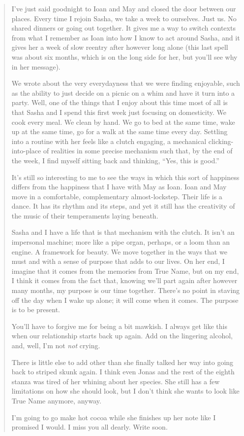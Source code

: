 \begin{quote}
I've just said goodnight to Ioan and May and closed the door between our places. Every time I rejoin Sasha, we take a week to ourselves. Just us. No shared dinners or going out together. It gives me a way to switch contexts from what I remember as Ioan into how I know to act around Sasha, and it gives her a week of slow reentry after however long alone (this last spell was about six months, which is on the long side for her, but you'll see why in her message).

We wrote about the very everydayness that we were finding enjoyable, such as the ability to just decide on a picnic on a whim and have it turn into a party. Well, one of the things that I enjoy about this time most of all is that Sasha and I spend this first week just focusing on domesticity. We cook every meal. We clean by hand. We go to bed at the same time, wake up at the same time, go for a walk at the same time every day. Settling into a routine with her feels like a clutch engaging, a mechanical clicking-into-place of realities in some precise mechanism such that, by the end of the week, I find myself sitting back and thinking, ``Yes, this is good.''

It's still so interesting to me to see the ways in which this sort of happiness differs from the happiness that I have with May as Ioan. Ioan and May move in a comfortable, complementary almost-lockstep. Their life is a dance. It has its rhythm and its steps, and yet it still has the creativity of the music of their temperaments laying beneath.

Sasha and I have a life that is that mechanism with the clutch. It isn't an impersonal machine; more like a pipe organ, perhaps, or a loom than an engine. A framework for beauty. We move together in the ways that we must and with a sense of purpose that adds to our lives. On her end, I imagine that it comes from the memories from True Name, but on my end, I think it comes from the fact that, knowing we'll part again after however many months, my purpose is our time together. There's no point in staving off the day when I wake up alone; it will come when it comes. The purpose is to be present.

You'll have to forgive me for being a bit mawkish. I always get like this when our relationship starts back up again. Add on the lingering alcohol, and, well, I'm not \emph{not} crying.

There is little else to add other than she finally talked her way into going back to striped skunk again. I think even Jonas and the rest of the eighth stanza was tired of her whining about her species. She still has a few limitations on how she should look, but I don't think she wants to look like True Name anymore, anyway.

I'm going to go make hot cocoa while she finishes up her note like I promised I would. I miss you all dearly. Write soon.
\end{quote}

